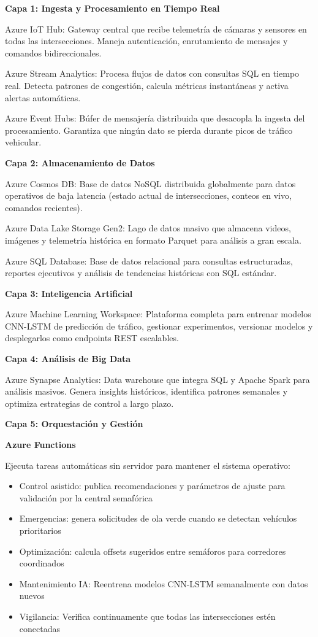 \documentclass[12pt,a4paper,oneside]{report}
\begin{document}
\textbf{Capa 1: Ingesta y Procesamiento en Tiempo Real}

Azure IoT Hub: Gateway central que recibe telemetría de cámaras y sensores en todas las intersecciones. Maneja autenticación, enrutamiento de mensajes y comandos bidireccionales.

Azure Stream Analytics: Procesa flujos de datos con consultas SQL en tiempo real. Detecta patrones de congestión, calcula métricas instantáneas y activa alertas automáticas.

Azure Event Hubs: Búfer de mensajería distribuida que desacopla la ingesta del procesamiento. Garantiza que ningún dato se pierda durante picos de tráfico vehicular.

\textbf{Capa 2: Almacenamiento de Datos}

Azure Cosmos DB: Base de datos NoSQL distribuida globalmente para datos operativos de baja latencia (estado actual de intersecciones, conteos en vivo, comandos recientes).

Azure Data Lake Storage Gen2: Lago de datos masivo que almacena videos, imágenes y telemetría histórica en formato Parquet para análisis a gran escala.

Azure SQL Database: Base de datos relacional para consultas estructuradas, reportes ejecutivos y análisis de tendencias históricas con SQL estándar.

\textbf{Capa 3: Inteligencia Artificial}

Azure Machine Learning Workspace: Plataforma completa para entrenar modelos CNN-LSTM de predicción de tráfico, gestionar experimentos, versionar modelos y desplegarlos como endpoints REST escalables.

\textbf{Capa 4: Análisis de Big Data}

Azure Synapse Analytics: Data warehouse que integra SQL y Apache Spark para análisis masivos. Genera insights históricos, identifica patrones semanales y optimiza estrategias de control a largo plazo.

\textbf{Capa 5: Orquestación y Gestión}

\textbf{Azure Functions}

Ejecuta tareas automáticas sin servidor para mantener el sistema operativo:

\begin{itemize}
\item
  Control asistido: publica recomendaciones y parámetros de ajuste para validación por la central semafórica
\item
  Emergencias: genera solicitudes de ola verde cuando se detectan vehículos prioritarios
\item
  Optimización: calcula offsets sugeridos entre semáforos para corredores coordinados
\item
  Mantenimiento IA: Reentrena modelos CNN-LSTM semanalmente con datos nuevos
\item
  Vigilancia: Verifica continuamente que todas las intersecciones estén conectadas
\end{itemize}
\end{document}
